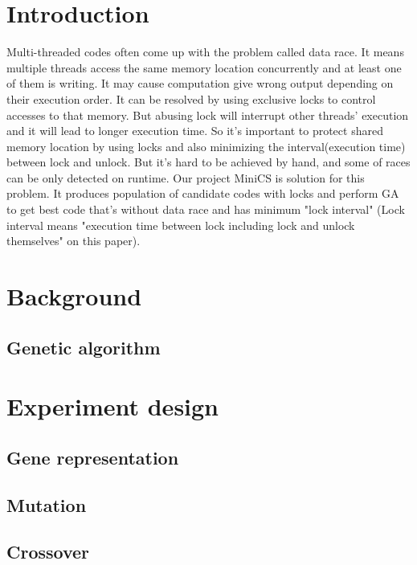 \documentclass[sigconf]{acmart}
\begin{document}
\section{Introduction}
Multi-threaded codes often come up with the problem called data race. It means multiple threads access the same memory location concurrently and at least one of them is writing. It may cause computation give wrong output depending on their execution order. It can be resolved by using exclusive locks to control accesses to that memory. But abusing lock will interrupt other threads' execution and it will lead to longer execution time.
So it's important to protect shared memory location by using locks and also minimizing the interval(execution time) between lock and unlock. But it's hard to be achieved by hand, and some of races can be only detected on runtime.
Our project MiniCS is solution for this problem. It produces population of candidate codes with locks and perform GA to get best code that's without data race and has minimum "lock interval" (Lock interval means "execution time between lock including lock and unlock themselves" on this paper).

\section{Background}



\subsection{Genetic algorithm}

\section{Experiment design}



\subsection{Gene representation}



\subsection{Mutation}

\subsection{Crossover}
\end{document}
